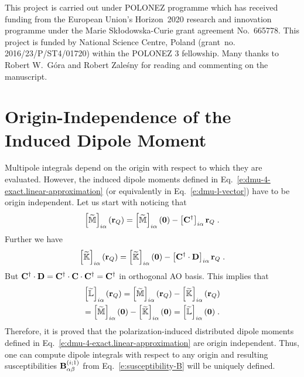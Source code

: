 \documentclass[aip,amsmath,amssymb,reprint,floatfix]{revtex4-1}
\begin{document}
\begin{acknowledgments}
This project is carried out under POLONEZ programme which has received funding from the European Union's
Horizon~2020 research and innovation programme under the Marie Skłodowska-Curie grant agreement 
No.~665778. This project is funded by National Science Centre, Poland 
(grant~no. 2016/23/P/ST4/01720) within the POLONEZ 3 fellowship.
Many thanks to Robert W.~G{\'o}ra and Robert Zale{\'s}ny 
for reading and commenting on the manuscript.
\end{acknowledgments}

%
\appendix

\section{\label{a:orig-dep} Origin-Independence of the Induced Dipole Moment}

Multipole integrals depend on the origin with respect to which they are evaluated.
However, the induced dipole moments defined in Eq.~\eqref{e:dmu-4-exact.linear-approximation} 
(or equivalently in Eq.~\eqref{e:dmu-l-vector})
have to be origin independent. 
Let us start with noticing that
%
\begin{equation}
 \left[ \widetilde{\mathbb{M}} \right]_{i\alpha} ({\bf r}_Q) 
 = \left[ \widetilde{\mathbb{M}} \right]_{i\alpha} ({\bf 0}) - \left[ {\bf C}^\dagger \right]_{i\alpha} {\bf r}_Q  \;.
\end{equation}
%
Further we have
%
\begin{equation}
 \left[ \widetilde{\mathbb{K}} \right]_{i\alpha} ({\bf r}_Q) 
 = \left[ \widetilde{\mathbb{K}} \right]_{i\alpha} ({\bf 0}) - \left[ {\bf C}^\dagger \cdot {\bf D} \right]_{i\alpha} {\bf r}_Q \;.
\end{equation}
%
But ${\bf C}^\dagger \cdot {\bf D}={\bf C}^\dagger \cdot {\bf C} \cdot {\bf C}^\dagger={\bf C}^\dagger$ in orthogonal
AO basis. This implies that
%
\begin{multline}
   \left[ \widetilde{\mathbb{L}} \right]_{i\alpha} ({\bf r}_Q) 
 = \left[ \widetilde{\mathbb{M}} \right]_{i\alpha} ({\bf r}_Q) 
 - \left[ \widetilde{\mathbb{K}} \right]_{i\alpha} ({\bf r}_Q) \\
 = \left[ \widetilde{\mathbb{M}} \right]_{i\alpha} ({\bf 0})   
 - \left[ \widetilde{\mathbb{K}} \right]_{i\alpha} ({\bf 0})
 = \left[ \widetilde{\mathbb{L}} \right]_{i\alpha} ({\bf 0}) \;.
\end{multline}
%
Therefore, it is proved that the polarization\hyp{}induced distributed dipole moments 
defined in Eq.~\eqref{e:dmu-4-exact.linear-approximation} 
are origin independent.
Thus, one can compute dipole integrals with respect to any origin and resulting
susceptibilities ${\bf B}_{\alpha\beta}^{(i;1)}$ from Eq.~\eqref{e:susceptibility-B} will be uniquely defined.
\end{document}
